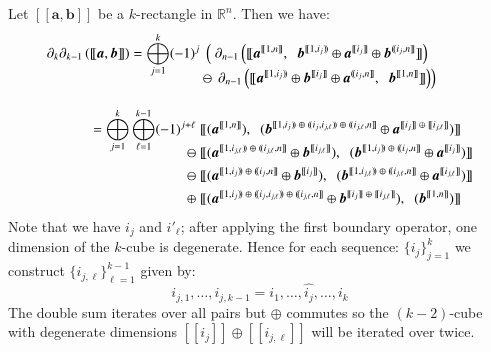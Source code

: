 Let $[\![\boldsymbol{a}, \boldsymbol{b}]\!]$ be a $k$-rectangle in $\mathbb{R}^n$.
Then we have:
\begin{align}
	\partial_k \partial_{k-1} \left( [\![ \boldsymbol{a}, \boldsymbol{b} ]\!] \right) 
	= \bigoplus_{j=1}^k (-1)^j 
		& \;  \left( \; \partial_{n-1} \left(	
			[\![ 	\boldsymbol{a}^{[\![1,n]\!]}, \;\;
				\boldsymbol{b}^{[\![1,i_j)\!)}
					\oplus \boldsymbol{a}^{[\![i_j]\!]}
					\oplus \boldsymbol{b}^{(\!(i_j,n]\!]} 
			]\!] 
		\right) \right. \notag\\[-1em]
		& \ominus \; \left. \! \partial_{n-1} \left(
			[\![ 	\boldsymbol{a}^{[\![1,i_j)\!)}
					\oplus \boldsymbol{b}^{[\![i_j]\!]}
					\oplus \boldsymbol{a}^{(\!(i_j,n]\!]} , \;\;
				\boldsymbol{b}^{[\![1,n]\!]}
			]\!] 
		\right)\right) \\[1em]
	= \bigoplus_{j=1}^k \bigoplus_{\ell=1}^{k-1} (-1)^{j+\ell}
		\;&
			[\![ 	(\boldsymbol{a}^{[\![1,n]\!]}), \;\;
				(\boldsymbol{b}^{[\![1,i_j)\!) \;\oplus\; (\!(i_j,i_{j,\ell})\!) \;\oplus\; (\!(i_{j,\ell},n]\!]}
					\oplus \boldsymbol{a}^{[\![i_j]\!] \;\oplus\; [\![i_{j,\ell}]\!]})
			]\!] \notag\\[-1em]
		\ominus \;&
			[\![ 	(\boldsymbol{a}^{[\![1,i_{j,\ell})\!) \;\oplus\; (\!(i_{j,\ell},n]\!]}
					\oplus \boldsymbol{b}^{[\![i_{j,\ell}]\!]}), \;\;
				(\boldsymbol{b}^{[\![1,i_j)\!) \;\oplus\; (\!(i_j,n]\!]}
					\oplus \boldsymbol{a}^{[\![i_j]\!]})
			]\!] \notag\\
		\ominus \; &
			[\![ 	(\boldsymbol{a}^{[\![1,i_j)\!) \;\oplus\; (\!(i_j,n]\!]}
					\oplus \boldsymbol{b}^{[\![i_j]\!]}), \;\;
				(\boldsymbol{b}^{[\![1,i_{j,\ell})\!) \;\oplus\; (\!(i_{j,\ell},n]\!]}
					\oplus \boldsymbol{a}^{[\![i_{j,\ell}]\!]})
			]\!] \notag\\
		\oplus \;&
			[\![ 	(\boldsymbol{a}^{[\![1,i_j)\!) \;\oplus\; (\!(i_j,i_{j,\ell})\!) \;\oplus\; (\!(i_{j,\ell},n]\!]}
					\oplus \boldsymbol{b}^{[\![i_j]\!] \;\oplus\; [\![i_{j,\ell}]\!]}), \;\;
				(\boldsymbol{b}^{[\![1,n]\!]})
			]\!] 
\end{align}
Note that we have $i_j$ and $i'_\ell$; after applying the first boundary operator, one dimension of the $k$-cube is degenerate.
Hence for each sequence: $\{i_j\}_{j=1}^k$ we construct $\{i_{j,\ell}\}_{\ell=1}^{k-1}$ given by:
\begin{equation}
	i_{j,1} , \ldots, i_{j,k-1} = i_1, \ldots, \widehat{i_j}, \ldots, i_k
\end{equation}
The double sum iterates over all pairs but $\oplus$ commutes so the $(k-2)$-cube with degenerate dimensions $[\![i_j]\!] \oplus [\![i_{j,\ell}]\!]$ will be iterated over twice. 
